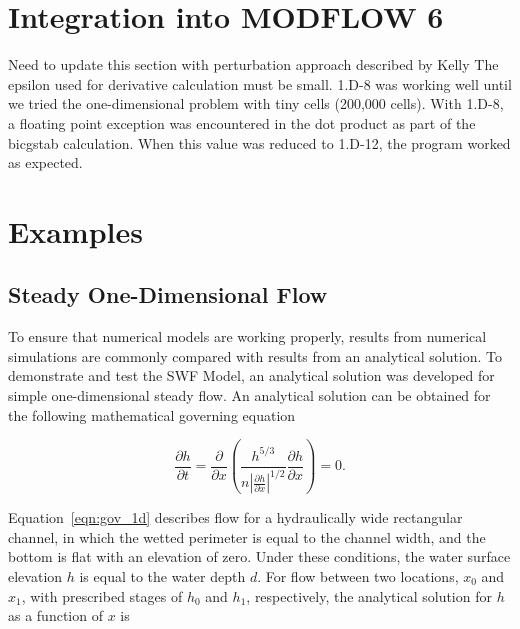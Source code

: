 \documentclass[fleqn]{article}
\begin{document}
\section{Integration into MODFLOW 6}

Need to update this section with perturbation approach described by Kelly
The epsilon used for derivative calculation must be small.  1.D-8 was working well until we tried the one-dimensional problem with tiny cells (200,000 cells).  With 1.D-8, a floating point exception was encountered in the dot product as part of the bicgstab calculation.  When this value was reduced to 1.D-12, the program worked as expected.

\newpage
\section{Examples}


\subsection{Steady One-Dimensional Flow}

To ensure that numerical models are working properly, results from numerical simulations are commonly compared with results from an analytical solution.  To demonstrate and test the SWF Model, an analytical solution was developed for simple one-dimensional steady flow.  An analytical solution can be obtained for the following mathematical governing equation

\begin{equation}
  \frac{\partial h}{\partial t} = \frac{\partial}{\partial x} 
  \left ( \frac{h^{5/3}}{n \left | \frac{\partial h}{\partial x} \right |^{1/2}} 
  \frac{\partial h}{\partial x} \right ) = 0 .
  \label{eqn:gov_1d}
\end{equation}

\noindent Equation~\ref{eqn:gov_1d} describes flow for a hydraulically wide rectangular channel, in which the wetted perimeter is equal to the channel width, and the bottom is flat with an elevation of zero.  Under these conditions, the water surface elevation $h$ is equal to the water depth $d$.  For flow between two locations, $x_0$ and $x_1$, with prescribed stages of $h_0$ and $h_1$, respectively, the analytical solution for $h$ as a function of $x$ is
\end{document}
